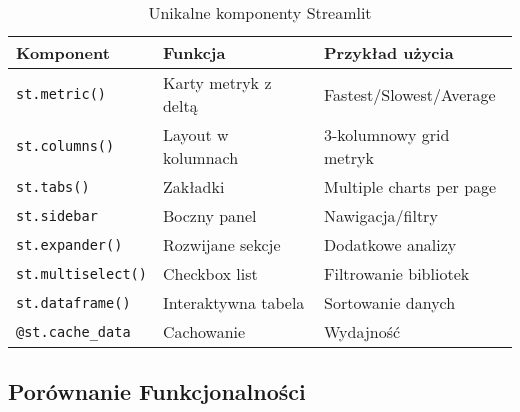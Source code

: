 \documentclass[a4paper,11pt]{article}
\begin{document}
\begin{table}[h]
\centering
\caption{Unikalne komponenty Streamlit}
\label{tab:streamlit_unique}
\begin{tabular}{@{}lll@{}}
\toprule
\textbf{Komponent} & \textbf{Funkcja} & \textbf{Przykład użycia} \\
\midrule
\texttt{st.metric()} & Karty metryk z deltą & Fastest/Slowest/Average \\
\texttt{st.columns()} & Layout w kolumnach & 3-kolumnowy grid metryk \\
\texttt{st.tabs()} & Zakładki & Multiple charts per page \\
\texttt{st.sidebar} & Boczny panel & Nawigacja/filtry \\
\texttt{st.expander()} & Rozwijane sekcje & Dodatkowe analizy \\
\texttt{st.multiselect()} & Checkbox list & Filtrowanie bibliotek \\
\texttt{st.dataframe()} & Interaktywna tabela & Sortowanie danych \\
\texttt{@st.cache\_data} & Cachowanie & Wydajność \\
\bottomrule
\end{tabular}
\end{table}

\subsection{Porównanie Funkcjonalności}
\end{document}

